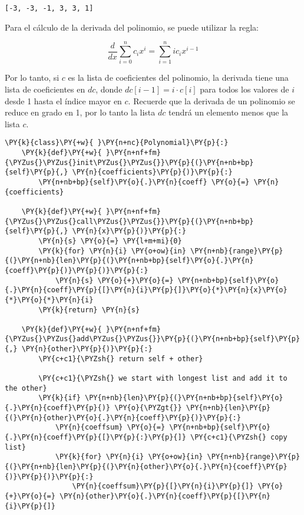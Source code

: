 \begin{example}
\begin{Verbatim}[commandchars=\\\{\}]
[-3, -3, -1, 3, 3, 1]
\end{Verbatim}

Para el cálculo de la derivada del polinomio, se puede utilizar la regla:

\[ \dfrac{d}{dx}\sum_{i=0}^n c_ix^i = \sum_{i=1}^n ic_ix^{i-1} \]

Por lo tanto, si \(c\) es la lista de coeficientes del polinomio, la
derivada tiene una lista de coeficientes en \(dc\), donde
\(dc[i-1] = i\cdot c[i]\) para todos los valores de \(i\) desde 1 hasta
el índice mayor en \(c\). Recuerde que la derivada de un polinomio se
reduce en grado en 1, por lo tanto la lista \(dc\) tendrá un elemento
menos que la lista \(c\).

\begin{tcolorbox}[breakable, size=fbox, boxrule=1pt, pad at break*=1mm,colback=cellbackground, colframe=cellborder]
\begin{Verbatim}[commandchars=\\\{\}]
\PY{k}{class}\PY{+w}{ }\PY{n+nc}{Polynomial}\PY{p}{:}
    \PY{k}{def}\PY{+w}{ }\PY{n+nf+fm}{\PYZus{}\PYZus{}init\PYZus{}\PYZus{}}\PY{p}{(}\PY{n+nb+bp}{self}\PY{p}{,} \PY{n}{coefficients}\PY{p}{)}\PY{p}{:}
        \PY{n+nb+bp}{self}\PY{o}{.}\PY{n}{coeff} \PY{o}{=} \PY{n}{coefficients}

    \PY{k}{def}\PY{+w}{ }\PY{n+nf+fm}{\PYZus{}\PYZus{}call\PYZus{}\PYZus{}}\PY{p}{(}\PY{n+nb+bp}{self}\PY{p}{,} \PY{n}{x}\PY{p}{)}\PY{p}{:}
        \PY{n}{s} \PY{o}{=} \PY{l+m+mi}{0}
        \PY{k}{for} \PY{n}{i} \PY{o+ow}{in} \PY{n+nb}{range}\PY{p}{(}\PY{n+nb}{len}\PY{p}{(}\PY{n+nb+bp}{self}\PY{o}{.}\PY{n}{coeff}\PY{p}{)}\PY{p}{)}\PY{p}{:}
            \PY{n}{s} \PY{o}{+}\PY{o}{=} \PY{n+nb+bp}{self}\PY{o}{.}\PY{n}{coeff}\PY{p}{[}\PY{n}{i}\PY{p}{]}\PY{o}{*}\PY{n}{x}\PY{o}{*}\PY{o}{*}\PY{n}{i}
        \PY{k}{return} \PY{n}{s}
    
    \PY{k}{def}\PY{+w}{ }\PY{n+nf+fm}{\PYZus{}\PYZus{}add\PYZus{}\PYZus{}}\PY{p}{(}\PY{n+nb+bp}{self}\PY{p}{,} \PY{n}{other}\PY{p}{)}\PY{p}{:}
        \PY{c+c1}{\PYZsh{} return self + other}

        \PY{c+c1}{\PYZsh{} we start with longest list and add it to the other}
        \PY{k}{if} \PY{n+nb}{len}\PY{p}{(}\PY{n+nb+bp}{self}\PY{o}{.}\PY{n}{coeff}\PY{p}{)} \PY{o}{\PYZgt{}} \PY{n+nb}{len}\PY{p}{(}\PY{n}{other}\PY{o}{.}\PY{n}{coeff}\PY{p}{)}\PY{p}{:}
            \PY{n}{coeffsum} \PY{o}{=} \PY{n+nb+bp}{self}\PY{o}{.}\PY{n}{coeff}\PY{p}{[}\PY{p}{:}\PY{p}{]} \PY{c+c1}{\PYZsh{} copy list}
            \PY{k}{for} \PY{n}{i} \PY{o+ow}{in} \PY{n+nb}{range}\PY{p}{(}\PY{n+nb}{len}\PY{p}{(}\PY{n}{other}\PY{o}{.}\PY{n}{coeff}\PY{p}{)}\PY{p}{)}\PY{p}{:}
                \PY{n}{coeffsum}\PY{p}{[}\PY{n}{i}\PY{p}{]} \PY{o}{+}\PY{o}{=} \PY{n}{other}\PY{o}{.}\PY{n}{coeff}\PY{p}{[}\PY{n}{i}\PY{p}{]}


\end{Verbatim}
\end{tcolorbox}
\end{example}

